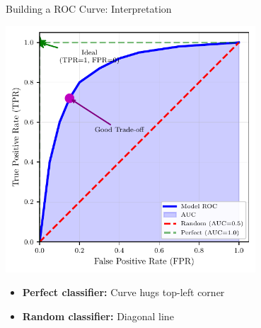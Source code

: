 \documentclass{beamer}
\begin{document}
\begin{frame}{Building a ROC Curve: Interpretation}
\begin{center}
\includegraphics[width=0.7\textwidth]{roc-curve-diagram.pdf}
\end{center}

\vspace{0.15cm}

\begin{itemize}
    \item \textbf{Perfect classifier:} Curve hugs top-left corner
    \item \textbf{Random classifier:} Diagonal line
\end{itemize}
\end{frame}
\end{document}
